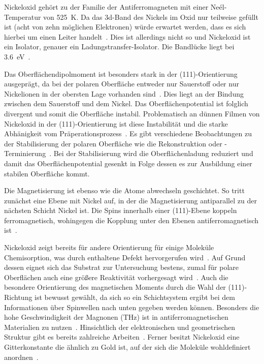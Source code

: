             Nickeloxid gehört zu der Familie der Antiferromagneten mit einer Neél-Temperatur von \SI{525}{\kelvin}.
            Da das 3d-Band des Nickels im Oxid nur teilweise gefüllt ist (acht von zehn möglichen Elektronen) würde erwartet werden, dass es sich hierbei um einen Leiter handelt~\cite{kunz_chemisorption_1985}.
            Dies ist allerdings nicht so und Nickeloxid ist ein Isolator, genauer ein Ladungstransfer-Isolator.
            Die Bandlücke liegt bei \SI{3.6}{\electronvolt}~\cite{kunz_chemisorption_1985}.

            Das Oberflächendipolmoment ist besonders stark in der (111)-Orientierung ausgeprägt, da bei der polaren Oberfläche entweder nur Sauerstoff oder nur Nickelionen in der obersten Lage vorhanden sind~\cite{NiO_8}.
            Dies liegt an der Bindung zwischen dem Sauerstoff und dem Nickel.
            Das Oberflächenpotential ist folglich divergent und somit die Oberfläche instabil.
            Problematisch an dünnen Filmen von Nickeloxid in der (111)-Orientierung ist diese Instabilität und die starke Abhänigkeit vom Präperationsprozess~\cite{NiO_36}.
            Es gibt verschiedene Beobachtungen zu der Stabilisierung der polaren Oberfläche wie die Rekonstruktion oder -Terminierung~\cite{NiO_36, NiO_35, NiO_34, NiO_27, NiO_10}.
            Bei der Stabilisierung wird die Oberflächenladung reduziert und damit das Oberflächenpotential gesenkt in Folge dessen es zur Ausbildung einer stabilen Oberfläche kommt.

            Die Magnetisierung ist ebenso wie die Atome abwechseln geschichtet.
            So tritt zunächst eine Ebene mit Nickel auf, in der die Magnetisierung antiparallel zu der nächsten Schicht Nickel ist.
            Die Spins innerhalb einer (111)-Ebene koppeln ferromagnetisch, wohingegen die Kopplung unter den Ebenen antiferromagnetisch ist~\cite{FeO_6}.

            Nickeloxid zeigt bereits für andere Orientierung für einige Moleküle Chemisorption, was durch enthaltene Defekt hervorgerufen wird~\cite{kunz_chemisorption_1985}.
            Auf Grund dessen eignet sich das Substrat zur Untersuchung bestens, zumal für polare Oberflächen auch eine größere Reaktivität vorhergesagt wird~\cite{cappus_hydroxyl_1993}.
            Auch die besondere Orientierung des magnetischen Moments durch die Wahl der (111)-Richtung ist bewusst gewählt, da sich so ein Schichtsystem ergibt bei dem Informationen über Spinwellen nach unten gegeben werden können.
            Besonders die hohe Geschwindigkeit der Magnonen (\si{\tera\hertz}) ist in antiferromagnetischen Materialien zu nutzen~\cite{bossini_macrospin_2016}.
            Hinsichtlich der elektronischen und geometrischen Struktur gibt es bereits zahlreiche Arbeiten~\cite{NiO_7, NiO_34, NiO_35, NiO_37, NiO_8, NiO_13}.
            Ferner besitzt Nickeloxid eine Gitterkonstante die ähnlich zu Gold ist, auf der sich die Moleküle wohldefiniert anordnen~\cite{5A_1}.
            
